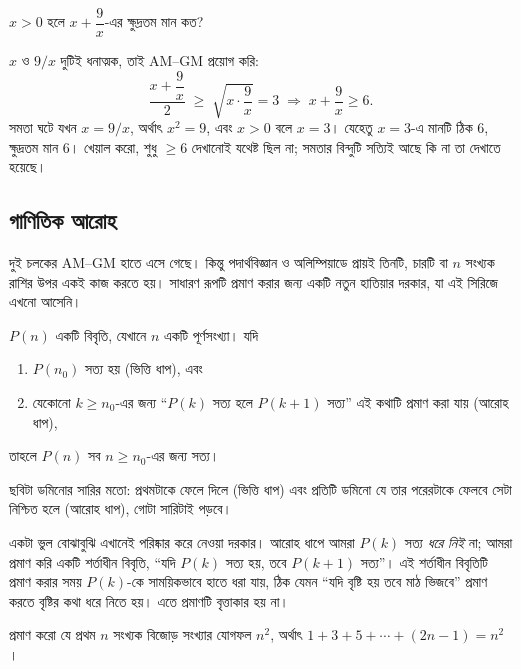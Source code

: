 \documentclass[11pt]{article}
\begin{document}
\begin{example}
$x > 0$ হলে $x + \dfrac{9}{x}$-এর ক্ষুদ্রতম মান কত?
\end{example}

\begin{solbox}
$x$ ও $9/x$ দুটিই ধনাত্মক, তাই AM--GM প্রয়োগ করি:
\[
  \frac{x + \dfrac{9}{x}}{2} \;\geq\; \sqrt{x \cdot \frac{9}{x}} = 3
  \;\Longrightarrow\; x + \frac{9}{x} \geq 6 .
\]
সমতা ঘটে যখন $x = 9/x$, অর্থাৎ $x^2 = 9$, এবং $x > 0$ বলে $x = 3$। যেহেতু
$x = 3$-এ মানটি ঠিক $6$, ক্ষুদ্রতম মান $6$। খেয়াল করো, শুধু $\geq 6$ দেখানোই
যথেষ্ট ছিল না; সমতার বিন্দুটি সত্যিই আছে কি না তা দেখাতে হয়েছে।
\end{solbox}

\subsection{গাণিতিক আরোহ}

দুই চলকের AM--GM হাতে এসে গেছে। কিন্তু পদার্থবিজ্ঞান ও অলিম্পিয়াডে প্রায়ই
তিনটি, চারটি বা $n$ সংখ্যক রাশির উপর একই কাজ করতে হয়। সাধারণ রূপটি প্রমাণ করার
জন্য একটি নতুন হাতিয়ার দরকার, যা এই সিরিজে এখনো আসেনি।

\begin{idea}
$P(n)$ একটি বিবৃতি, যেখানে $n$ একটি পূর্ণসংখ্যা। যদি
\begin{enumerate}
  \item $P(n_0)$ সত্য হয় (ভিত্তি ধাপ), এবং
  \item যেকোনো $k \geq n_0$-এর জন্য ``$P(k)$ সত্য হলে $P(k+1)$ সত্য'' এই কথাটি
        প্রমাণ করা যায় (আরোহ ধাপ),
\end{enumerate}
তাহলে $P(n)$ সব $n \geq n_0$-এর জন্য সত্য।
\end{idea}

ছবিটা ডমিনোর সারির মতো: প্রথমটাকে ফেলে দিলে (ভিত্তি ধাপ) এবং প্রতিটি ডমিনো যে
তার পরেরটাকে ফেলবে সেটা নিশ্চিত হলে (আরোহ ধাপ), গোটা সারিটাই পড়বে।

একটা ভুল বোঝাবুঝি এখানেই পরিষ্কার করে নেওয়া দরকার। আরোহ ধাপে আমরা $P(k)$ সত্য
\emph{ধরে নিই} না; আমরা প্রমাণ করি একটি শর্তাধীন বিবৃতি, ``যদি $P(k)$ সত্য হয়,
তবে $P(k+1)$ সত্য''। এই শর্তাধীন বিবৃতিটি প্রমাণ করার সময় $P(k)$-কে সাময়িকভাবে
হাতে ধরা যায়, ঠিক যেমন ``যদি বৃষ্টি হয় তবে মাঠ ভিজবে'' প্রমাণ করতে বৃষ্টির
কথা ধরে নিতে হয়। এতে প্রমাণটি বৃত্তাকার হয় না।

\begin{example}
প্রমাণ করো যে প্রথম $n$ সংখ্যক বিজোড় সংখ্যার যোগফল $n^2$, অর্থাৎ
$1 + 3 + 5 + \cdots + (2n-1) = n^2$।
\end{example}
\end{document}
